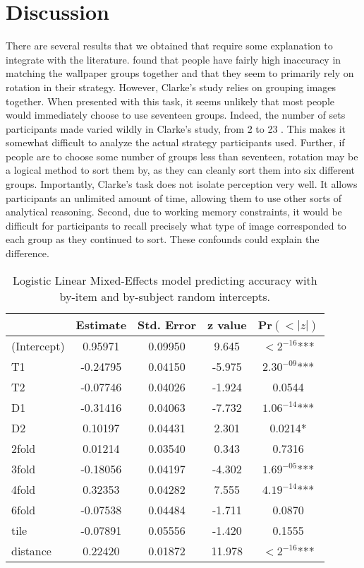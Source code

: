 \section{Discussion}
There are several results that we obtained that require some explanation to integrate with the literature. \citet{clarke} found that people have fairly high inaccuracy in matching the wallpaper groups together and that they seem to primarily rely on rotation in their strategy. However, Clarke's study relies on grouping images together. When presented with this task, it seems unlikely that most people would immediately choose to use seventeen groups. Indeed, the number of sets participants made varied wildly in Clarke's study, from 2 to 23 \citep{clarke}. This makes it somewhat difficult to analyze the actual strategy participants used. Further, if people are to choose some number of groups less than seventeen, rotation may be a logical method to sort them by, as they can cleanly sort them into six different groups. Importantly, Clarke's task does not isolate perception very well. It allows participants an unlimited amount of time, allowing them to use other sorts of analytical reasoning. Second, due to working memory constraints, it would be difficult for participants to recall precisely what type of image corresponded to each group as they continued to sort. These confounds could explain the difference.

\begin{table}
\centering
\begin{tabular}{|l|cccc|}
\hline
& Estimate & Std. Error & z value & Pr$(<|z|)$  \\ \hline
(Intercept) & 0.95971 &  0.09950 & 9.645 & $<2^{-16}$*** \\ \hline
T1 & -0.24795 &  0.04150 & -5.975 & $2.30^{-09}$*** \\ \hline
T2 & -0.07746 & 0.04026 & -1.924 & 0.0544 \\ \hline
D1 & -0.31416 & 0.04063 & -7.732 & $1.06^{-14}$*** \\ \hline
D2 & 0.10197 & 0.04431 & 2.301 & 0.0214* \\ \hline
2fold & 0.01214 & 0.03540 & 0.343 & 0.7316 \\ \hline
3fold & -0.18056 & 0.04197 & -4.302 & $1.69^{-05}$*** \\ \hline
4fold & 0.32353 & 0.04282 & 7.555 & $4.19^{-14}$*** \\ \hline
6fold & -0.07538 & 0.04484 & -1.711 & 0.0870 \\ \hline
tile & -0.07891 & 0.05556 & -1.420 & 0.1555 \\ \hline
distance & 0.22420 & 0.01872 & 11.978 & $<2^{-16}$*** \\ \hline
\end{tabular}
\label{fixeff}
\caption{Logistic Linear Mixed-Effects model predicting accuracy with by-item and by-subject random intercepts. }
\end{table}

